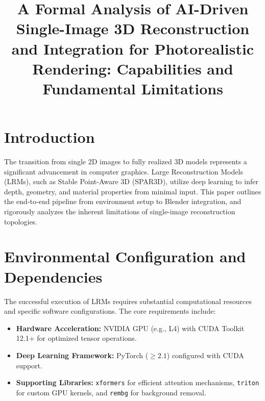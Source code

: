 \documentclass[10pt,journal,compsoc]{IEEEtran}
\begin{document}
\title{A Formal Analysis of AI-Driven Single-Image 3D Reconstruction and Integration for Photorealistic Rendering: Capabilities and Fundamental Limitations}


\maketitle
\IEEEdisplaynontitleabstractindextext
\IEEEpeerreviewmaketitle


\newtheorem{theorem}{Theorem}
\newtheorem{lemma}{Lemma}
\newtheorem{definition}{Definition}

\section{Introduction}
The transition from single 2D images to fully realized 3D models represents a significant advancement in computer graphics. Large Reconstruction Models (LRMs), such as Stable Point-Aware 3D (SPAR3D), utilize deep learning to infer depth, geometry, and material properties from minimal input. This paper outlines the end-to-end pipeline from environment setup to Blender integration, and rigorously analyzes the inherent limitations of single-image reconstruction topologies.

\section{Environmental Configuration and Dependencies}
The successful execution of LRMs requires substantial computational resources and specific software configurations. The core requirements include:
\begin{itemize}
    \item \textbf{Hardware Acceleration:} NVIDIA GPU (e.g., L4) with CUDA Toolkit 12.1+ for optimized tensor operations.
    \item \textbf{Deep Learning Framework:} PyTorch ($\ge 2.1$) configured with CUDA support.
    \item \textbf{Supporting Libraries:} \texttt{xformers} for efficient attention mechanisms, \texttt{triton} for custom GPU kernels, and \texttt{rembg} for background removal.
\end{itemize}
\end{document}
